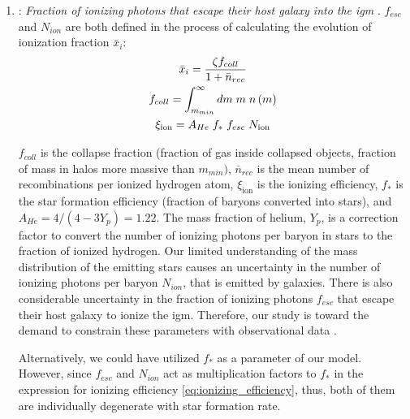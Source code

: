 \documentclass[12pt, TexShade, letterpaper]{report}
\begin{document}
\begin{enumerate}
    \item {}: \emph{Fraction of ionizing photons that escape their host galaxy into the \gls{igm}} \cite{ares_documentation}.
    $f_{esc}$ and $N_{ion}$ are both defined in the process of calculating the evolution of ionization fraction $\bar{x}_i$:
    \begin{gather}
        \bar{x}_i = \frac{\zeta f_{coll}}{1 + \bar{n}_{rec}}\\
        f_{coll} = \int_{m_{min}}^\infty dm \hspace{0.1cm} m \hspace{0.1cm} n\left(m\right)\\
        \xi_{\text{ion}} = A_{He} \hspace{0.1cm} f_* \hspace{0.1cm} f_{esc} \hspace{0.1cm} N_{\text{ion}} \label{eq:ionizing_efficiency}
    \end{gather}
    
    $f_{coll}$ is the collapse fraction (fraction of gas inside collapsed objects, fraction of mass in halos more massive than $m_{min})$, $\bar{n}_{rec}$ is the mean number of recombinations per ionized hydrogen atom, $\xi_{\text{ion}}$ is the ionizing efficiency, $f_*$ is the star formation efficiency (fraction of baryons converted into stars), and $A_{He} = 4/(4 - 3Y_p) = 1.22$. The mass fraction of helium, $Y_p$, is a correction factor to convert the number of ionizing photons per baryon in stars to the fraction of ionized hydrogen. Our limited understanding of the mass distribution of the emitting stars causes an uncertainty in the number of ionizing photons per baryon $N_{ion}$, that is emitted by galaxies. There is also considerable uncertainty in the fraction of ionizing photons $f_{esc}$ that escape their host galaxy to ionize the \gls{igm}. Therefore, our study is toward the demand to constrain these parameters with observational data \cite{low_frequency, 21century}.\par
    Alternatively, we could have utilized $f_*$ as a parameter of our model. However, since $f_{esc}$ and $N_{ion}$ act as multiplication factors to $f_*$ in the expression for ionizing efficiency \ref{eq:ionizing_efficiency}, thus, both of them are individually degenerate with star formation rate.
\end{enumerate}
\end{document}
